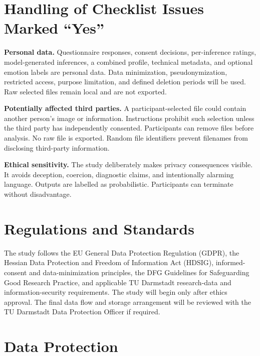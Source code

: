 \documentclass[10pt,a4paper]{article}
\begin{document}
\section*{Handling of Checklist Issues Marked ``Yes''}
\textbf{Personal data.} Questionnaire responses, consent decisions, per-inference ratings, model-generated inferences, a combined profile, technical metadata, and optional emotion labels are personal data. Data minimization, pseudonymization, restricted access, purpose limitation, and defined deletion periods will be used. Raw selected files remain local and are not exported.

\textbf{Potentially affected third parties.} A participant-selected file could contain another person's image or information. Instructions prohibit such selection unless the third party has independently consented. Participants can remove files before analysis. No raw file is exported. Random file identifiers prevent filenames from disclosing third-party information.

\textbf{Ethical sensitivity.} The study deliberately makes privacy consequences visible. It avoids deception, coercion, diagnostic claims, and intentionally alarming language. Outputs are labelled as probabilistic. Participants can terminate without disadvantage.

\section*{Regulations and Standards}
The study follows the EU General Data Protection Regulation (GDPR), the Hessian Data Protection and Freedom of Information Act (HDSIG), informed-consent and data-minimization principles, the DFG Guidelines for Safeguarding Good Research Practice, and applicable TU Darmstadt research-data and information-security requirements. The study will begin only after ethics approval. The final data flow and storage arrangement will be reviewed with the TU Darmstadt Data Protection Officer if required.

\newpage
\section*{Data Protection}

\end{document}
